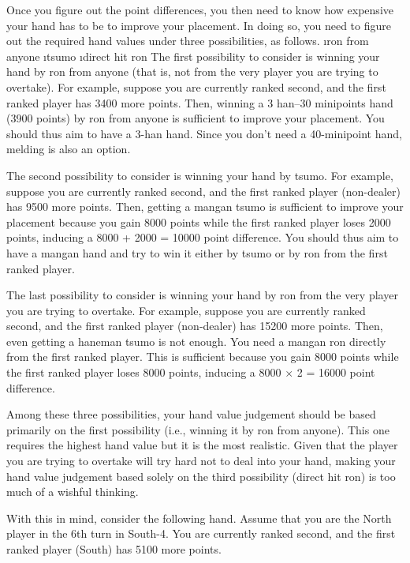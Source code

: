 \bigskip
Once you figure out the point differences, you then need to know how expensive your hand has to be to improve your placement. In doing so, you need to figure out the required hand values under three possibilities, as follows.
\be
\i {\jap ron} from anyone
\i {\jap tsumo}
\i direct hit {\jap ron}
\ee
The first possibility to consider is winning your hand by {\jap ron} from anyone (that is, not from the very player you are trying to overtake). For example, suppose you are currently ranked second, and the first ranked player has 3400 more points. Then, winning a 3 {\jap han}--30 minipoints hand (3900 points) by {\jap ron} from anyone is sufficient to improve your placement. You should thus aim to have a 3-{\jap han} hand. Since you don't need a 40-minipoint hand, melding is also an option.

\bigskip
The second possibility to consider is winning your hand by {\jap tsumo}. For example, suppose you are currently ranked second, and the first ranked player (non-dealer) has 9500 more points. Then, getting a {\jap mangan tsumo} is sufficient to improve your placement because you gain 8000 points while the first ranked player loses 2000 points, inducing a 8000 + 2000 = 10000 point difference. You should thus aim to have a {\jap mangan} hand and try to win it either by {\jap tsumo} or by {\jap ron} from the first ranked player.

\bigskip
The last possibility to consider is winning your hand by {\jap ron} from the very player you are trying to overtake. For example, suppose you are currently ranked second, and the first ranked player (non-dealer) has 15200 more points. Then, even getting a {\jap haneman tsumo} is not enough. You need a {\jap mangan ron} directly from the first ranked player. This is sufficient because you gain 8000 points while the first ranked player loses 8000 points, inducing a 8000 $\times$ 2 = 16000 point difference.

\bigskip
Among these three possibilities, your hand value judgement should be based primarily on the first possibility (i.e., winning it by {\jap ron} from anyone). This one requires the highest hand value but it is the most realistic. Given that the player you are trying to overtake will try hard not to deal into your hand, making your hand value judgement based solely on the third possibility (direct hit {\jap ron}) is too much of a wishful thinking.

\bigskip
With this in mind, consider the following hand. Assume that you are the North player in the 6th turn in South-4. You are currently ranked second, and the first ranked player (South) has 5100 more points.

